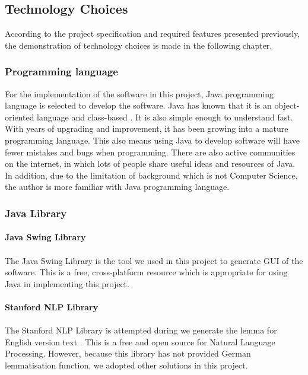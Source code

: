 \subsection{Technology Choices}
According to the project specification and required features presented previously, the demonstration of technology choices is made in the following chapter.
\subsubsection{Programming language}
For the implementation of the software in this project, Java programming language is selected to develop the software. Java has known that it is an object-oriented language and class-based \cite{Gosling2014}. It is also simple enough to understand fast. With years of upgrading and improvement, it has been growing into a mature programming language. This also means using Java to develop software will have fewer mistakes and bugs when programming. There are also active communities on the internet, in which lots of people share useful ideas and resources of Java. In addition, due to the limitation of background which is not Computer Science, the author is more familiar with Java programming language.  

\subsubsection{Java Library}

\paragraph{Java Swing Library}
\paragraph[]{} The Java Swing Library is the tool we used in this project to generate GUI of the software. This is a free, cross-platform resource which is appropriate for using Java in implementing this project.

\paragraph{Stanford NLP Library}
\paragraph[]{} The Stanford NLP Library is attempted during we generate the lemma for English version text \cite{StanfordNLP}. This is a free and open source for Natural Language Processing. However, because this library has not provided German lemmatisation function, we adopted other solutions in this project.

